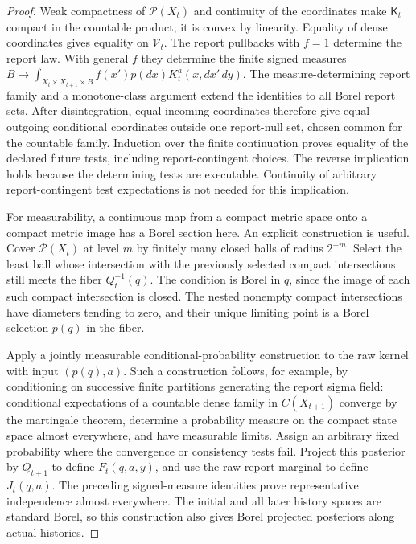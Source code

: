 \begin{proof}
Weak compactness of $\mathcal P(X_t)$ and continuity of the coordinates make $\mathsf K_t$ compact in the countable product; it is convex by linearity. Equality of dense coordinates gives equality on $\mathcal V_t$. The report pullbacks with $f=1$ determine the report law. With general $f$ they determine the finite signed measures
$B\mapsto\int_{X_t\times X_{t+1}\times B}f(x')p(dx)K_t^a(x,dx'\,dy)$.
The measure-determining report family and a monotone-class argument extend the identities to all Borel report sets. After disintegration, equal incoming coordinates therefore give equal outgoing conditional coordinates outside one report-null set, chosen common for the countable family. Induction over the finite continuation proves equality of the declared future tests, including report-contingent choices. The reverse implication holds because the determining tests are executable. Continuity of arbitrary report-contingent test expectations is not needed for this implication.

For measurability, a continuous map from a compact metric space onto a compact metric image has a Borel section here. An explicit construction is useful. Cover $\mathcal P(X_t)$ at level $m$ by finitely many closed balls of radius $2^{-m}$. Select the least ball whose intersection with the previously selected compact intersections still meets the fiber $Q_t^{-1}(q)$. The condition is Borel in $q$, since the image of each such compact intersection is closed. The nested nonempty compact intersections have diameters tending to zero, and their unique limiting point is a Borel selection $p(q)$ in the fiber.

Apply a jointly measurable conditional-probability construction to the raw kernel with input $(p(q),a)$. Such a construction follows, for example, by conditioning on successive finite partitions generating the report sigma field: conditional expectations of a countable dense family in $C(X_{t+1})$ converge by the martingale theorem, determine a probability measure on the compact state space almost everywhere, and have measurable limits. Assign an arbitrary fixed probability where the convergence or consistency tests fail. Project this posterior by $Q_{t+1}$ to define $F_t(q,a,y)$, and use the raw report marginal to define $J_t(q,a)$. The preceding signed-measure identities prove representative independence almost everywhere. The initial and all later history spaces are standard Borel, so this construction also gives Borel projected posteriors along actual histories.


\end{proof}

